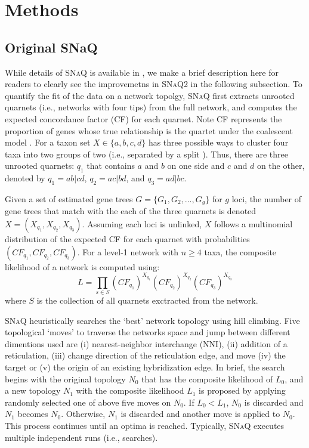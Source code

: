 \documentclass[unnumsec,webpdf,contemporary,large]{oup-authoring-template}%
\theoremstyle{thmstyleone}%
\theoremstyle{thmstyletwo}%
\theoremstyle{thmstylethree}%
\begin{document}
\section{Methods}\label{sec2}
\subsection{Original SNaQ}\label{subsec1}
While details of \textsc{SNaQ} is available in \cite{solis-lemus2016}, we make a brief description here for readers to clearly see the improvemetns in \textsc{SNaQ2} in the following subsection. To quantify the fit of the data on a network topolgy, \textsc{SNaQ} first extracts unrooted quarnets (i.e., networks with four tips) from the full network, and computes the expected concordance factor (CF) for each quarnet. Note CF represents the proportion of genes whose true relationship is the quartet under the coalescent model \citep{baum2007}. For a taxon set $X\in\{a,b,c,d\}$ has three possible ways to cluster four taxa into two groups of two (i.e., separated by a split \citep{chifman2014}). Thus, there are three unrooted quarnets: $q_1$ that contains $a$ and $b$ on one side and $c$ and $d$ on the other, denoted by $q_1=ab|cd$, $q_2=ac|bd$, and $q_3=ad|bc$.

Given a set of estimated gene trees $G=\{G_1,G_2,\dots,G_g\}$ for $g$ loci, the number of gene trees that match with the each of the three quarnets is denoted $X=(X_{q_1},X_{q_2},X_{q_3})$. Assuming each loci is unlinked, $X$ follows a multinomial distribution of the expected CF for each quarnet with probabilities $(CF_{q_1},CF_{q_2},CF_{q_3})$. For a level-1 network with $n\ge4$ taxa, the composite likelihood of a network is computed using:
\begin{equation}
    L=\prod_{s \in S}(CF_{q_1})^{X_{q_1}}(CF_{q_2})^{X_{q_2}}(CF_{q_3})^{X_{q_3}}
\label{eqn1}
\end{equation}
\noindent where $S$ is the collection of all quarnets exctracted from the network.

\textsc{SNaQ} heuristically searches the `best' network topology using hill climbing. Five topological `moves' to traverse the networks space and jump between different dimentions used are (i) nearest-neighbor interchange (NNI), (ii) addition of a reticulation, (iii) change direction of the reticulation edge, and move (iv) the target or (v) the origin of an existing hybridization edge. In brief, the search begins with the original topology $N_0$ that has the composite likelihood of $L_0$, and a new topology $N_1$ with the composite likelihood $L_1$ is proposed by applying randomly selected one of above five moves on $N_0$. If $L_0 < L_1$, $N_0$ is discarded and $N_1$ becomes $N_0$. Otherwise, $N_1$ is discarded and another move is applied to $N_0$. This process continues until an optima is reached. Typically, \textsc{SNaQ} executes multiple independent runs (i.e., searches). 
\end{document}
